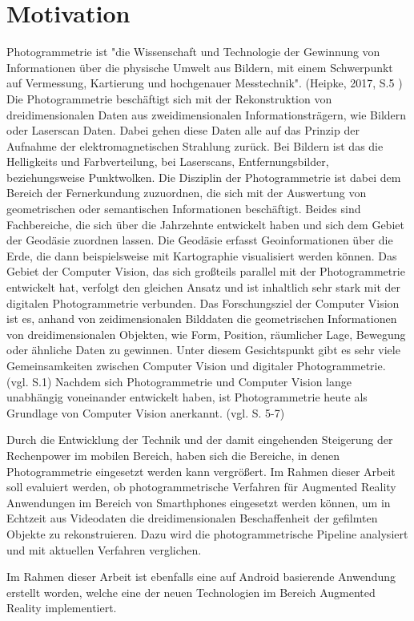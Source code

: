\chapter{Motivation}

Photogrammetrie ist "die Wissenschaft und Technologie der Gewinnung von Informationen
über die physische Umwelt aus Bildern, mit einem Schwerpunkt auf Vermessung,
Kartierung und hochgenauer Messtechnik". (Heipke, 2017, S.5 \cite{photo})  Die Photogrammetrie beschäftigt sich  mit der Rekonstruktion von dreidimensionalen Daten aus zweidimensionalen Informationsträgern, wie Bildern oder Laserscan Daten. Dabei gehen diese Daten alle auf das Prinzip der Aufnahme der elektromagnetischen Strahlung zurück. Bei Bildern ist das die Helligkeits und Farbverteilung, bei Laserscans, Entfernungsbilder, beziehungsweise Punktwolken. Die Disziplin der Photogrammetrie ist dabei dem Bereich der Fernerkundung zuzuordnen, die sich mit der Auswertung von geometrischen oder semantischen Informationen beschäftigt. Beides sind Fachbereiche, die sich über die Jahrzehnte entwickelt haben und sich dem Gebiet der Geodäsie zuordnen lassen. Die Geodäsie erfasst Geoinformationen über die Erde, die dann beispielsweise mit Kartographie visualisiert werden können. Das Gebiet der Computer Vision, das sich großteils parallel mit der Photogrammetrie entwickelt hat, verfolgt den gleichen Ansatz und ist inhaltlich sehr stark mit der digitalen Photogrammetrie verbunden. Das Forschungsziel der Computer Vision ist es, anhand von zeidimensionalen Bilddaten die geometrischen Informationen von dreidimensionalen Objekten, wie Form, Position, räumlicher Lage, Bewegung oder ähnliche Daten zu gewinnen. Unter diesem Gesichtspunkt gibt es sehr viele Gemeinsamkeiten zwischen Computer Vision und digitaler Photogrammetrie. (vgl. \cite{pose_est_epi} S.1) Nachdem sich Photogrammetrie und Computer Vision lange unabhängig voneinander entwickelt haben, ist Photogrammetrie heute als Grundlage von Computer Vision anerkannt. (vgl. \cite{photo} S. 5-7)

Durch die Entwicklung der Technik und der damit eingehenden Steigerung der Rechenpower im mobilen Bereich, haben sich die Bereiche, in denen Photogrammetrie eingesetzt werden kann vergrößert. Im Rahmen dieser Arbeit soll evaluiert werden, ob photogrammetrische Verfahren für Augmented Reality Anwendungen im Bereich von Smarthphones eingesetzt werden können, um in Echtzeit aus Videodaten die dreidimensionalen Beschaffenheit der gefilmten Objekte zu rekonstruieren. Dazu wird die photogrammetrische Pipeline analysiert und mit aktuellen Verfahren verglichen.

Im Rahmen dieser Arbeit ist ebenfalls eine auf Android basierende Anwendung erstellt worden, welche eine der neuen Technologien im Bereich Augmented Reality implementiert.



  


